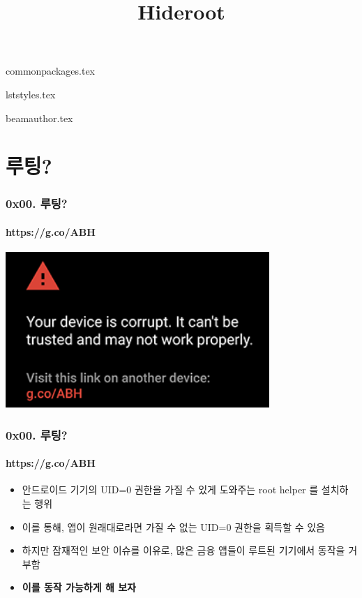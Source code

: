 

 {commonpackages.tex}

\setsansfont {Noto Sans CJK KR}
\setmainfont {Noto Sans CJK KR}
\setmonofont[Scale=0.8]{DejaVu Sans Mono}

 {lststyles.tex}

\hypersetup {
  colorlinks, linkcolor=blue
}

\title {Hideroot}
 {beamauthor.tex}




\begin{frame}
  \titlepage
\end{frame}

\section[Section]{루팅?}
\begin{frame}
  \frametitle{0x00. 루팅?}
  \framesubtitle{https://g.co/ABH}

  \begin{center}
    \includegraphics [width=100mm]{img/corrupted_nexus.png}
  \end{center}
\end{frame}

\begin{frame}
  \frametitle{0x00. 루팅?}
  \framesubtitle{https://g.co/ABH}

  \begin{itemize}
  \item 안드로이드 기기의 UID=0 권한을 가질 수 있게 도와주는 root helper 를 설치하는 행위
  \item<2-> 이를 통해, 앱이 원래대로라면 가질 수 없는 UID=0 권한을 획득할 수 있음
  \item<3-> 하지만 잠재적인 보안 이슈를 이유로, 많은 금융 앱들이 루트된 기기에서 동작을 거부함
  \item<4-> \textbf{이를 동작 가능하게 해 보자}
  \end{itemize}
\end{frame}
 
